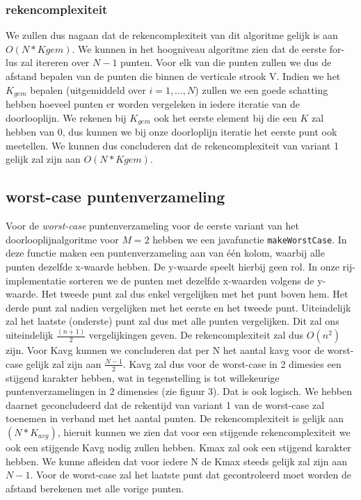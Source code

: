 \documentclass[12pt]{article}
\begin{document}
\subsubsection{rekencomplexiteit}

We zullen dus nagaan dat de rekencomplexiteit van dit algoritme gelijk is aan $O(N*Kgem)$.
We kunnen in het hoogniveau algoritme zien dat de eerste for-lus zal itereren over $N-1$ punten.
Voor elk van die punten zullen we dus de afstand bepalen van de punten die binnen de verticale strook V.
Indien we het $K_{gem}$ bepalen (uitgemiddeld over $i = 1,...,N$) zullen we een goede schatting hebben hoeveel punten er worden vergeleken in iedere iteratie van de doorlooplijn.
We rekenen bij $K_{gem}$ ook het eerste element bij die een $K$ zal hebben van 0, dus kunnen we bij onze doorloplijn iteratie het eerste punt ook meetellen.
We kunnen dus concluderen dat de rekencomplexiteit van variant 1 gelijk zal zijn aan $O(N*Kgem)$.

\subsection{worst-case puntenverzameling}

Voor de \textit{worst-case} puntenverzameling voor de eerste variant van het doorlooplijnalgoritme voor $M = 2$ hebben we een javafunctie \texttt{makeWorstCase}.
In deze functie maken een puntenverzameling aan van één kolom, waarbij alle punten dezelfde x-waarde hebben.
De y-waarde speelt hierbij geen rol.
In onze rij-implementatie sorteren we de punten met dezelfde x-waarden volgens de y-waarde.
Het tweede punt zal dus enkel vergelijken met het punt boven hem.
Het derde punt zal nadien vergelijken met het eerste en het tweede punt.
Uiteindelijk zal het laatste (onderste) punt zal dus met alle punten vergelijken.
Dit zal ons uiteindelijk $\frac{(n+1)}{2}$ vergelijkingen geven. De rekencomplexiteit zal dus $O(n^2)$ zijn.
Voor Kavg kunnen we concluderen dat per N het aantal kavg voor de worst-case gelijk zal zijn aan $\frac{N-1}{2}$.
Kavg zal dus voor de worst-case in 2 dimesies een stijgend karakter hebben, wat in tegenstelling is tot willekeurige puntenverzamelingen in 2 dimensies (zie figuur 3).
Dat is ook logisch. We hebben daarnet geconcludeerd dat de rekentijd van variant 1 van de worst-case zal toenemen in verband met het aantal punten.
De rekencomplexiteit is gelijk aan $(N*K_{avg})$, hieruit kunnen we zien dat voor een stijgende rekencomplexiteit we ook een stijgende Kavg nodig zullen hebben.
Kmax zal ook een stijgend karakter hebben. We kunne afleiden dat voor iedere N de Kmax steeds gelijk zal zijn aan $N-1$.
Voor de worst-case zal het laatste punt dat gecontroleerd moet worden de afstand berekenen met alle vorige punten.
\end{document}
